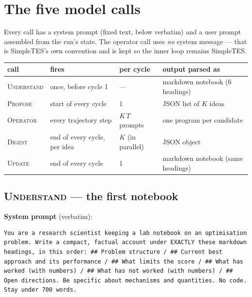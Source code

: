 \documentclass[11pt]{article}
\newcommand{\call}[1]{\textsc{#1}}
\begin{document}
\section{The five model calls}

Every call has a system prompt (fixed text, below verbatim) and a user prompt assembled from the
run's state. The operator call uses \emph{no} system message --- that is SimpleTES's own
convention and is kept so the inner loop remains SimpleTES.

\begin{center}\small
\begin{tabular}{llll}
\toprule
call & fires & per cycle & output parsed as \\
\midrule
\call{Understand} & once, before cycle 1 & --- & markdown notebook (6 headings) \\
\call{Propose} & start of every cycle & 1 & JSON list of $K$ ideas \\
\call{Operator} & every trajectory step & $K\,T$ prompts\footnotemark &
  one program per candidate \\
\call{Digest} & end of every cycle, per idea & $K$ (in parallel) & JSON object \\
\call{Update} & end of every cycle & 1 & markdown notebook (same headings) \\
\bottomrule
\end{tabular}
\end{center}

\subsection{\call{Understand} --- the first notebook}

\noindent\textbf{System prompt} (verbatim):
\begin{lstlisting}
You are a research scientist keeping a lab notebook on an optimisation problem. Write a compact, factual account under EXACTLY these markdown headings, in this order: ## Problem structure / ## Current best approach and its performance / ## What limits the score / ## What has worked (with numbers) / ## What has not worked (with numbers) / ## Open directions. Be specific about mechanisms and quantities. No code. Stay under 700 words.
\end{lstlisting}
\end{document}
